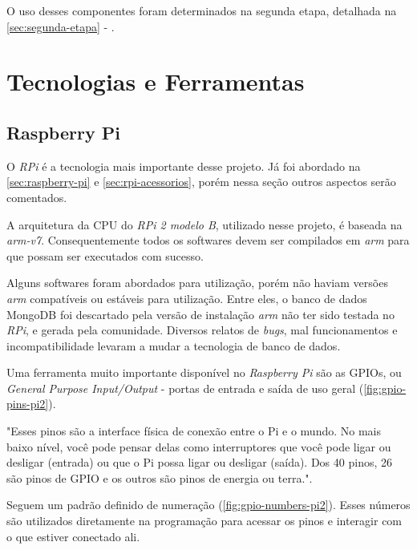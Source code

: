 O uso desses componentes foram determinados na segunda etapa, detalhada na \autoref{sec:segunda-etapa} - .


\section{Tecnologias e Ferramentas}\label{sec:tecnologias-ferramentas}


\subsection{Raspberry Pi}\label{sec:rpi-tecnologia}

O \textit{RPi} é a tecnologia mais importante desse projeto. Já foi abordado na \autoref{sec:raspberry-pi} e \autoref{sec:rpi-acessorios}, porém nessa seção outros aspectos serão comentados.

A arquitetura da CPU do \textit{RPi 2 modelo B}, utilizado nesse projeto, é baseada na \textit{arm-v7}. Consequentemente todos os softwares devem ser compilados em \textit{arm} para que possam ser executados com sucesso. 

Alguns softwares foram abordados para utilização, porém não haviam versões \textit{arm} compatíveis ou estáveis para utilização. Entre eles, o banco de dados MongoDB foi descartado pela versão de instalação \textit{arm} não ter sido testada no \textit{RPi}, e gerada pela comunidade. Diversos relatos de \textit{bugs}, mal funcionamentos e incompatibilidade levaram a mudar a tecnologia de banco de dados.

Uma ferramenta muito importante disponível no \textit{Raspberry Pi} são as GPIOs, ou \textit{General Purpose Input/Output} - portas de entrada e saída de uso geral (\autoref{fig:gpio-pins-pi2}).  

\begin{citacao}
"Esses pinos são a interface física de conexão entre o Pi e o mundo. No mais baixo nível, você pode pensar delas como interruptores que você pode ligar ou desligar (entrada) ou que o Pi possa ligar ou desligar (saída). Dos 40 pinos, 26 são pinos de GPIO e os outros são pinos de energia ou terra.". \cite{rpi-gpio}
\end{citacao}

Seguem um padrão definido de numeração (\autoref{fig:gpio-numbers-pi2}). Esses números são utilizados diretamente na programação para acessar os pinos e interagir com o que estiver conectado ali.

